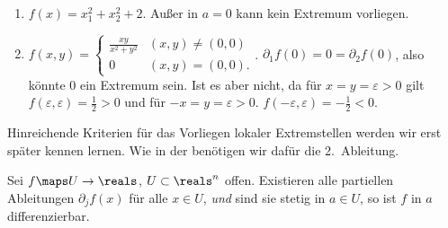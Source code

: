 \begin{beispiele*}
    \begin{enumerate}
        \item \( f(x)=x_1^2+x_2^2+2 \). Außer in \( a=0 \) kann kein Extremum vorliegen.
        \item \( f(x,y)=\begin{cases}
            \frac{xy}{x^2+y^2}&(x,y)\neq (0,0)\\
            0 &(x,y)=(0,0).
        \end{cases} \). \( \partial_1 f(0)=0=\partial_2 f(0) \), also könnte \( 0 \) ein Extremum sein. Ist es aber nicht, da für \( x=y=\varepsilon>0 \) gilt \( f(\varepsilon,\varepsilon)=\frac{1}{2}>0 \) und für \( -x=y=\varepsilon>0 \). \( f(-\varepsilon,\varepsilon)=-\frac{1}{2}<0 \).
    \end{enumerate}
\end{beispiele*}
\begin{bemerkung*}
    Hinreichende Kriterien für das Vorliegen lokaler Extremstellen werden wir erst später kennen lernen. Wie in der  benötigen wir dafür die 2.\ Ableitung.
\end{bemerkung*}
\begin{satz}\label{stetige_partielle_zu_ableitung}
     Sei \( f\maps U\to \reals \), \( U\subset \reals^n \) offen. Existieren alle partiellen Ableitungen \( \partial_j f(x) \) für alle \( x\in U \), \emph{und} sind sie stetig in \( a\in U \), so ist \( f \) in \( a \) differenzierbar.
\end{satz}
